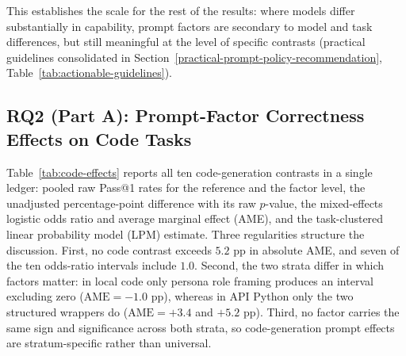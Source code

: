 \documentclass[a4paper,fleqn]{cas-sc}
\begin{document}
This establishes the scale for the rest of the results: where models differ substantially in capability, prompt factors are secondary to model and task differences, but still meaningful at the level of specific contrasts (practical guidelines consolidated in Section~\ref{practical-prompt-policy-recommendation}, Table~\ref{tab:actionable-guidelines}).

\subsection{RQ2 (Part A): Prompt-Factor Correctness Effects on Code Tasks}\label{prompt-factor-effects-on-code-tasks}

Table~\ref{tab:code-effects} reports all ten code-generation contrasts in a single ledger: pooled raw Pass@1 rates for the reference and the factor level, the unadjusted percentage-point difference with its raw $p$-value, the mixed-effects logistic odds ratio and average marginal effect (AME), and the task-clustered linear probability model (LPM) estimate. Three regularities structure the discussion. First, no code contrast exceeds $5.2$ pp in absolute AME, and seven of the ten odds-ratio intervals include $1.0$. Second, the two strata differ in which factors matter: in local code only persona role framing produces an interval excluding zero ($\text{AME} = -1.0$ pp), whereas in API Python only the two structured wrappers do ($\text{AME} = +3.4$ and $+5.2$ pp). Third, no factor carries the same sign and significance across both strata, so code-generation prompt effects are stratum-specific rather than universal.
\end{document}
